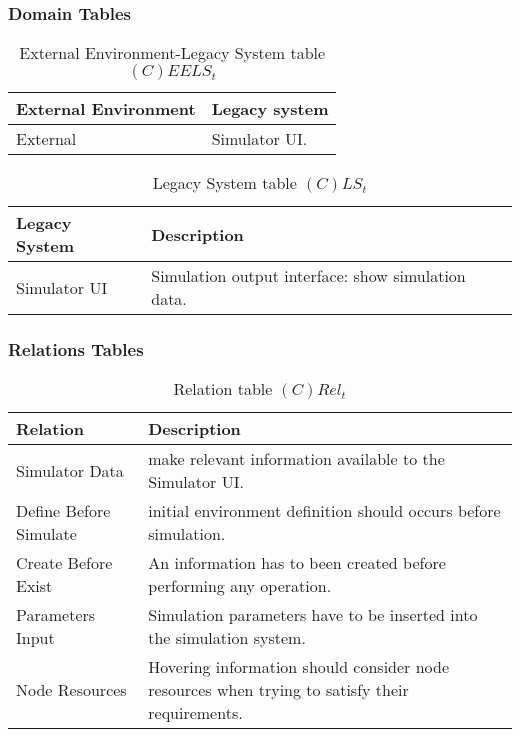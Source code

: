 \subsubsection*{Domain Tables}

\begin{table}[H]
	\centering
	\begin{tabular}{|p{4cm}|p{8cm}|}
			\hline
			\textbf{External Environment} & \textbf{Legacy system} \\
			\hline
			External & Simulator UI. \\
			\hline
		\end{tabular}
	\caption{External Environment-Legacy System table $(C)EELS_t$}
	\label{tab:ceelst}
\end{table}

\begin{table}[H]
	\centering
	\begin{tabular}{|p{4cm}|p{8cm}|}
			\hline
			\textbf{Legacy System} & \textbf{Description} \\
			\hline
			Simulator UI & Simulation output interface: show simulation data. \\
			\hline
		\end{tabular}
	\caption{Legacy System table $(C)LS_t$}
	\label{tab:clst}
\end{table}

\subsubsection*{Relations Tables}

\begin{table}[H]
	\centering
	\begin{tabular}{|p{4cm}|p{8cm}|}
			\hline
			\textbf{Relation} & \textbf{Description} \\
			\hline
			Simulator Data & make relevant information available to the Simulator UI.
			\\
			\hline
			Define Before Simulate & initial environment definition should occurs
			before simulation. \\
			\hline
			Create Before Exist & An information has to been created before
			performing any operation. \\
			\hline
			Parameters Input & Simulation parameters have to be inserted into the
			simulation system. \\
			\hline
			Node Resources & Hovering information should consider node resources when
			trying to satisfy their requirements. \\
			\hline
		\end{tabular}
	\caption{Relation table $(C)Rel_t$}
	\label{tab:crelt}
\end{table}

